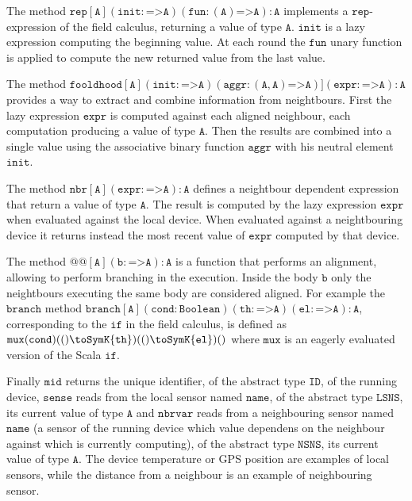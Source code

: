 The method $\mathtt{rep}[\mathtt{A}](\mathtt{init}: \texttt{=>} \mathtt{A})(\mathtt{fun}: (\mathtt{A}) \texttt{=>} \mathtt{A}): \mathtt{A}$ implements a $\mathtt{rep}$-expression of the field calculus, returning a value of type $\mathtt{A}$. $\mathtt{init}$ is a lazy expression computing the beginning value. At each round the $\mathtt{fun}$ unary function is applied to compute the new returned value from the last value.

The method $\mathtt{fooldhood}[\mathtt{A}](\mathtt{init}: \texttt{=>} \mathtt{A})(\mathtt{aggr}: (\mathtt{A},\mathtt{A}) \texttt{=>} \mathtt{A})](\mathtt{expr}: \texttt{=>} \mathtt{A}): \mathtt{A}$ provides a way to extract and combine information from neightbours. First the lazy expression $\mathtt{expr}$ is computed against each aligned neighbour, each computation producing a value of type $\mathtt{A}$. Then the results are combined into a single value using the associative binary function $\mathtt{aggr}$ with his neutral element $\mathtt{init}$.

The method $\mathtt{nbr}[\mathtt{A}](\mathtt{expr}: \texttt{=>} \mathtt{A}): \mathtt{A}$ defines a neightbour dependent expression that return a value of type $\mathtt{A}$. The result is computed by the lazy expression $\mathtt{expr}$ when evaluated against the local device. When evaluated against a neightbouring device it returns instead the most recent value of $\mathtt{expr}$ computed by that device.

The method $@@[\mathtt{A}](\mathtt{b}: \texttt{=>} \mathtt{A}): \mathtt{A}$ is a function that performs an alignment, allowing to perform branching in the execution. Inside the body $\mathtt{b}$ only the neightbours executing the same body are considered aligned. For example the $\mathtt{branch}$ method $\mathtt{branch}[\mathtt{A}](\mathtt{cond}: \mathtt{Boolean})(\mathtt{th}: \texttt{=>} \mathtt{A})(\mathtt{el}: \texttt{=>} \mathtt{A}): \mathtt{A}$, corresponding to the $\mathtt{if}$ in the field calculus, is defined as $\mathtt{mux}(\mathtt{cond})(()\toSymK{\mathtt{th}})(()\toSymK{\mathtt{el}})()$ where $\mathtt{mux}$ is an eagerly evaluated version of the Scala $\mathtt{if}$.

Finally $\mathtt{mid}$ returns the unique identifier, of the abstract type $\mathtt{ID}$, of the running device, $\mathtt{sense}$ reads from the local sensor named $\mathtt{name}$, of the abstract type $\mathtt{LSNS}$, its current value of type $\mathtt{A}$ and $\mathtt{nbrvar}$ reads from a neighbouring sensor named $\mathtt{name}$ (a sensor of the running device which value dependens on the neighbour against which is currently computing), of the abstract type $\mathtt{NSNS}$, its current value of type $\mathtt{A}$. The device temperature or GPS position are examples of local sensors, while the distance from a neighbour is an example of neighbouring sensor.

